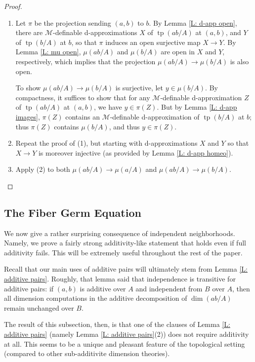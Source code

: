 \documentclass{amsart}
\theoremstyle{definition}
\newcommand{\tp}{\operatorname{tp}}
\begin{document}
\begin{proof}
    \begin{enumerate}
        \item Let $\pi$ be the projection sending $(a,b)$ to $b$. By Lemma \ref{L: d-app open}, there are $\mathcal M$-definable d-approximations $X$ of $\tp(ab/A)$ at $(a,b)$, and $Y$ of $\tp(b/A)$ at $b$, so that $\pi$ induces an open surjective map $X\rightarrow Y$. By Lemma \ref{L: mu open}, $\mu(ab/A)$ and $\mu(b/A)$ are open in $X$ and $Y$, respectively, which implies that the projection $\mu(ab/A)\rightarrow\mu(b/A)$ is also open. 
        
        To show $\mu(ab/A)\rightarrow\mu(b/A)$ is surjective, let $y\in\mu(b/A)$. By compactness, it suffices to show that for any $\mathcal M$-definable d-approximation $Z$ of $\tp(ab/A)$ at $(a,b)$, we have $y\in\pi(Z)$. But by Lemma \ref{L: d-app images}, $\pi(Z)$ contains an $\mathcal M$-definable d-approximation of $\tp(b/A)$ at $b$; thus $\pi(Z)$ contains $\mu(b/A)$, and thus $y\in\pi(Z)$.

        
        \item Repeat the proof of (1), but starting with d-approximations $X$ and $Y$ so that $X\rightarrow Y$ is moreover injective (as provided by Lemma \ref{L: d-app homeo}).
        \item Apply (2) to both $\mu(ab/A)\rightarrow\mu(a/A)$ and $\mu(ab/A)\rightarrow\mu(b/A)$.
    \end{enumerate}
\end{proof}


    \subsection{The Fiber Germ Equation}

We now give a rather surprising consequence of independent neighborhoods. Namely, we prove a fairly strong additivity-like statement that holds even if full additivity fails. This will be extremely useful throughout the rest of the paper.

    
Recall that our main uses of additive pairs will ultimately stem from Lemma \ref{L: additive pairs}. Roughly, that lemma said that independence is transitive for additive pairs: if $(a,b)$ is additive over $A$ and independent from $B$ over $A$, then all dimension computations in the additive decomposition of $\dim(ab/A)$ remain unchanged over $B$.

The result of this subsection, then, is that one of the clauses of Lemma \ref{L: additive pairs} (namely Lemma \ref{L: additive pairs}(2)) does not require additivity at all. This seems to be a unique and pleasant feature of the topological setting (compared to other sub-additivite dimension theories).
\end{document}

